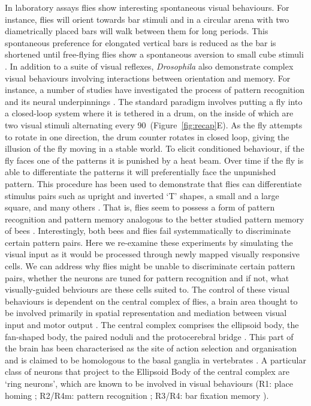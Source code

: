 In laboratory assays flies show interesting spontaneous visual behaviours. For instance, flies will orient towards bar stimuli \cite{Reichardt1969,Gotz1987} and in a circular arena with two diametrically placed bars will walk between them for long periods. This spontaneous preference for elongated vertical bars is reduced as the bar is shortened until free-flying flies show a spontaneous aversion to small cube stimuli \cite{Maimon2008}. In addition to a suite of visual reflexes, \emph{Drosophila} also demonstrate complex visual behaviours involving interactions between orientation and memory.
For instance, a number of studies have investigated the process of pattern recognition and its neural underpinnings \cite{Ernst1999,Liu2006,Pan2009}.
The standard paradigm involves putting a fly into a closed-loop system where it is tethered in a drum, on the inside of which are two visual stimuli alternating every 90\degree\ (Figure~\ref{fig:recap}E). As the fly attempts to rotate in one direction, the drum counter rotates in closed loop, giving the illusion of the fly moving in a stable world. To elicit conditioned behaviour, if the fly faces one of the patterns it is punished by a heat beam. Over time if the fly is able to differentiate the patterns it will preferentially face the unpunished pattern. This procedure has been used to demonstrate that flies can differentiate stimulus pairs such as upright and inverted `T' shapes, a small and a large square, and many others \cite{Ernst1999}. That is, flies seem to possess a form of pattern recognition and pattern memory analogous to the better studied pattern memory of bees \cite{vonFrisch1914,Giurfa1997,Horridge2009}. Interestingly, both bees and flies fail systemmatically to discriminate certain pattern pairs. Here we re-examine these experiments by simulating the visual input as it would be processed through newly mapped visually responsive cells. We can address why flies might be unable to discriminate certain pattern pairs, whether the neurons are tuned for pattern recognition and if not, what visually-guided behviours are these cells suited to. The control of these visual behaviours is dependent on the central complex of flies, a brain area thought to be involved primarily in spatial representation and mediation between visual input and motor output \cite{Pfeiffer2014}.
The central complex comprises the ellipsoid body, the fan-shaped body, the paired noduli and the protocerebral bridge \cite{Young2010}.
This part of the brain has been characterised as the site of action selection and organisation and is claimed to be homologous to the basal ganglia in vertebrates \cite{Strausfeld2013}.
A particular class of neurons that project to the Ellipsoid Body of the central complex are `ring neurons', which are known to be involved in visual behaviours (R1: place homing \cite{Sitaraman2008,Sitaraman2010,Ofstad2011}; R2/R4m: pattern recognition \cite{Ernst1999,Liu2006,Pan2009}; R3/R4: bar fixation memory \cite{Neuser2008}).

